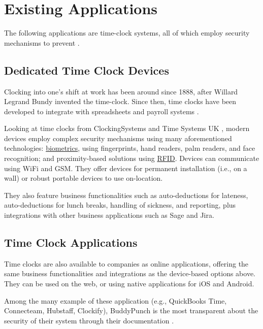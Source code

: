 \section{Existing Applications} \label{s:existing}

The following applications are \gls{time-clock} systems,
all of which employ security mechanisms to prevent
.

\subsection{Dedicated Time Clock Devices}

Clocking into one's shift at work has been around since
1888, after Willard Legrand Bundy invented the
\gls{time-clock}.
Since then, time clocks have been developed to integrate
with spreadsheets and payroll systems
\parencite{clockingHistory}.

Looking at time clocks from ClockingSystems
\parencite{clockingSystems} and Time Systems UK
\parencite{timeSystemsUk}, modern devices employ complex
security mechanisms using many aforementioned technologies:
\hyperref[ss:biometrics]{biometrics}, using fingerprints,
hand readers, palm readers, and face recognition; and
proximity-based solutions using \hyperref[ss:rfid]{RFID}.
Devices can communicate using WiFi and GSM.
They offer devices for permanent installation (i.e., on a
wall) or robust portable devices to use on-location.

They also feature business functionalities such as
auto-deductions for lateness, auto-deductions for lunch
breaks, handling of sickness, and reporting, plus
integrations with other business applications such as Sage
and Jira.

\subsection{Time Clock Applications}

Time clocks are also available to companies as online
applications, offering the same business functionalities
and integrations as the device-based options above.
They can be used on the web, or using native applications
for iOS and Android.

Among the many example of these application (e.g.,
QuickBooks Time, Connecteam, Hubstaff, Clockify),
BuddyPunch is the most transparent about the security of
their system through their documentation
\parencite{buddyPunchDocs}.

